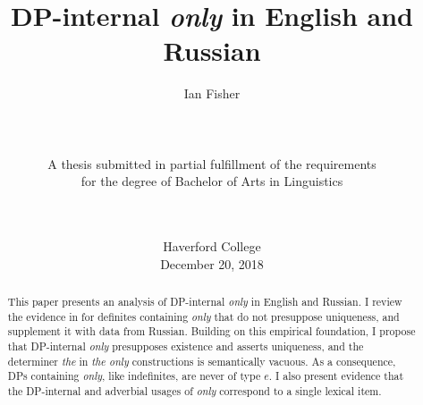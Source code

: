\documentclass{article}
\title{DP-internal \textit{only} in English and Russian}
\author{Ian Fisher \\ \\ \\ \\ A thesis submitted in partial fulfillment of the requirements \\ for the degree of Bachelor of Arts in Linguistics \\ \\ \\}  %
\date{Haverford College \\ December 20, 2018}
\begin{document}
\maketitle

\begin{abstract}
This paper presents an analysis of DP-internal \textit{only} in English and Russian. I review the evidence in \citet{cb2012b, cb2015} for definites containing \textit{only} that do not presuppose uniqueness, and supplement it with data from Russian. Building on this empirical foundation, I propose that DP-internal \textit{only} presupposes existence and asserts uniqueness, and the determiner \textit{the} in \textit{the only} constructions is semantically vacuous. As a consequence, DPs containing \textit{only}, like indefinites, are never of type $e$. I also present evidence that the DP-internal and adverbial usages of \textit{only} correspond to a single lexical item.
\end{abstract}

\newpage












\end{document}
